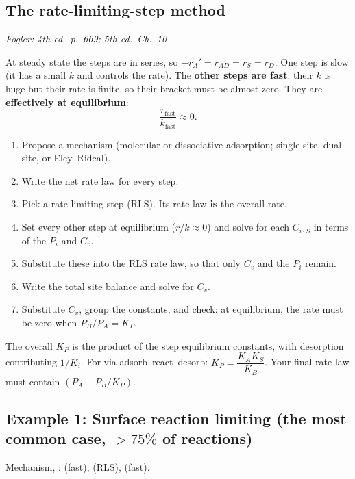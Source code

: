 \documentclass[11pt]{article}
\newcommand{\fogler}[1]{\hfill{\small\textit{\textcolor{keyblue}{Fogler: #1}}}}
\begin{document}
\subsection{The rate-limiting-step method}
\fogler{4th ed.\ p.~669; 5th ed.\ Ch.~10}

At steady state the steps are in series, so $-r_A'=r_{AD}=r_S=r_D$. One step is slow (it has a small $k$ and controls
the rate). The \textbf{other steps are fast}: their $k$ is huge but their rate is finite, so their bracket must be
almost zero. They are \textbf{effectively at equilibrium}:
\[
\frac{r_{\text{fast}}}{k_{\text{fast}}}\approx0 .
\]
\begin{keyresult}
\begin{enumerate}
\item Propose a mechanism (molecular or dissociative adsorption; single site, dual site, or Eley--Rideal).
\item Write the net rate law for every step.
\item Pick a rate-limiting step (RLS). Its rate law \textbf{is} the overall rate.
\item Set every other step at equilibrium ($r/k\approx0$) and solve for each $C_{i\cdot S}$ in terms of the $P_i$ and $C_v$.
\item Substitute these into the RLS rate law, so that only $C_v$ and the $P_i$ remain.
\item Write the total site balance and solve for $C_v$.
\item Substitute $C_v$, group the constants, and check: at equilibrium, the rate must be zero when $P_B/P_A=K_P$.
\end{enumerate}
\end{keyresult}

\begin{examtip}
The overall $K_P$ is the product of the step equilibrium constants, with desorption contributing $1/K_i$.
For  via adsorb--react--desorb: $K_P=\dfrac{K_AK_S}{K_B}$. Your final rate law must contain $(P_A-P_B/K_P)$.
\end{examtip}

\subsection{Example 1: Surface reaction limiting (the most common case, $>75\%$ of reactions)}
Mechanism, :\quad
{} (fast),\quad \underline{} (RLS),\quad {} (fast).
\end{document}
